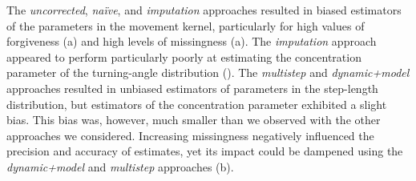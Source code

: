 \documentclass[abstract=on,10pt,a4paper,bibliography=totocnumbered]{article}
\begin{document}
The \textit{uncorrected}, \textit{na\"ive}, and \textit{imputation} approaches
resulted in biased estimators of the parameters in the movement kernel,
particularly for high values of forgiveness (a)
and high levels of missingness (a). The
\textit{imputation} approach appeared to perform particularly poorly at
estimating the concentration parameter of the turning-angle distribution
(). The \textit{multistep} and
\textit{dynamic+model} approaches resulted in unbiased estimators of parameters
in the step-length distribution, but estimators of the concentration parameter
exhibited a slight bias. This bias was, however, much smaller than we observed
with the other approaches we considered. Increasing missingness negatively
influenced the precision and accuracy of estimates, yet its impact could be
dampened using the \textit{dynamic+model} and \textit{multistep} approaches
(b).
\end{document}
